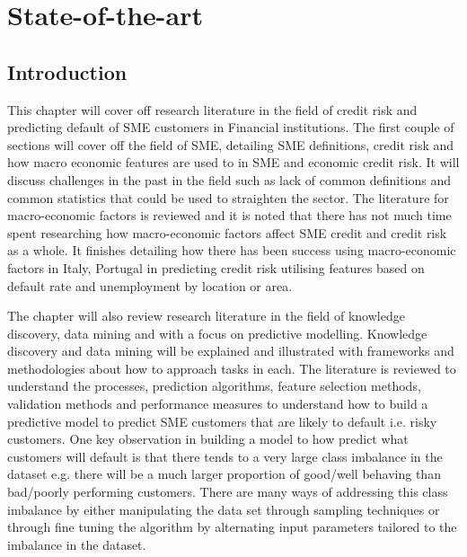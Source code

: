 
\chapter{State-of-the-art} %

\label{Chapter2} %


\section{Introduction}
This chapter will cover off research literature in the field of credit risk and predicting default of SME customers in Financial institutions. The first couple of sections will cover off the field of SME, detailing SME definitions, credit risk and how macro economic features are used to in SME and economic credit risk. It will discuss challenges in the past in the field such as lack of common definitions and common statistics that could be used to straighten the sector. The literature for macro-economic factors is reviewed and it is noted that there has not much time spent researching how macro-economic factors affect SME credit and credit risk as a whole. It finishes detailing how there has been success using macro-economic factors in Italy, Portugal in predicting credit risk utilising features based on default rate and unemployment by location or area.   

The chapter will also review research literature in the field of knowledge discovery, data mining and with a focus on predictive modelling. Knowledge discovery and data mining will be explained and illustrated with frameworks and methodologies about how to approach tasks in each. The literature is reviewed to understand the processes, prediction algorithms, feature selection methods,  validation methods and performance measures to understand how to build a predictive model to predict SME customers that are likely to default i.e. risky customers. One key observation in building a model to how predict what customers will default is that there tends to a very large class imbalance in the dataset e.g. there will be a much larger proportion of good/well behaving than bad/poorly performing customers. There are many ways of addressing this class imbalance by either manipulating the data set through sampling techniques or through fine tuning the algorithm by alternating input parameters tailored to the imbalance in the dataset.

